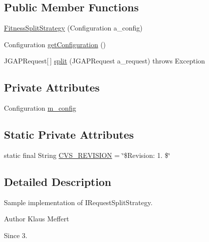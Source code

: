 \subsection*{Public Member Functions}
\begin{DoxyCompactItemize}
\item 
\hyperlink{classexamples_1_1grid_1_1fitness_distributed_1_1_fitness_split_strategy_ad9429aab3d63d9a0563ac04b09e8f06a}{Fitness\-Split\-Strategy} (Configuration a\-\_\-config)
\item 
Configuration \hyperlink{classexamples_1_1grid_1_1fitness_distributed_1_1_fitness_split_strategy_ad30e16f6d42d5473d9fc3d30de124271}{get\-Configuration} ()
\item 
J\-G\-A\-P\-Request\mbox{[}$\,$\mbox{]} \hyperlink{classexamples_1_1grid_1_1fitness_distributed_1_1_fitness_split_strategy_a83129f8f6b859f0f68e137794153900e}{split} (J\-G\-A\-P\-Request a\-\_\-request)  throws Exception 
\end{DoxyCompactItemize}
\subsection*{Private Attributes}
\begin{DoxyCompactItemize}
\item 
Configuration \hyperlink{classexamples_1_1grid_1_1fitness_distributed_1_1_fitness_split_strategy_add13c598e60b5dc93d48568dc6ba406e}{m\-\_\-config}
\end{DoxyCompactItemize}
\subsection*{Static Private Attributes}
\begin{DoxyCompactItemize}
\item 
static final String \hyperlink{classexamples_1_1grid_1_1fitness_distributed_1_1_fitness_split_strategy_abb77241590a641d668ccecee9e99a33a}{C\-V\-S\-\_\-\-R\-E\-V\-I\-S\-I\-O\-N} = \char`\"{}\$Revision\-: 1. \$\char`\"{}
\end{DoxyCompactItemize}


\subsection{Detailed Description}
Sample implementation of I\-Request\-Split\-Strategy.

\begin{DoxyAuthor}{Author}
Klaus Meffert 
\end{DoxyAuthor}
\begin{DoxySince}{Since}
3. 
\end{DoxySince}


